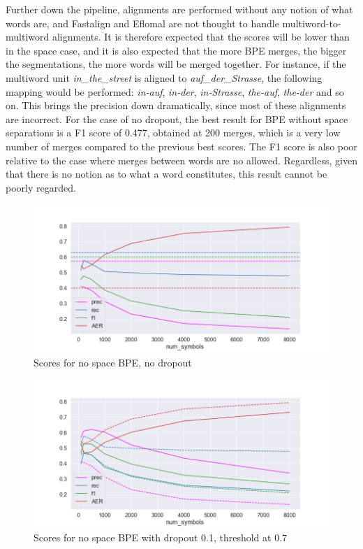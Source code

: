 Further down the pipeline, alignments are performed without any notion of what words are, and Fastalign and Eflomal are not thought to handle multiword-to-multiword alignments. It is therefore expected that the scores will be lower than in the space case, and it is also expected that the more BPE merges, the bigger the segmentations, the more words will be merged together. For instance, if the multiword unit \emph{in\_the\_street} is aligned to \emph{auf\_der\_Strasse}, the following mapping would be performed: \emph{in-auf}, \emph{in-der}, \emph{in-Strasse}, \emph{the-auf}, \emph{the-der} and so on. This brings the precision down dramatically, since most of these alignments are incorrect. For the case of no dropout, the best result for BPE without space separations is a F1 score of 0.477, obtained at 200 merges, which is a very low number of merges compared to the previous best scores. The F1 score is also poor relative to the case where merges between words are no allowed. Regardless, given that there is no notion as to what a word constitutes, this result cannot be poorly regarded.

\begin{figure}[!ht]
    \centering
    \includegraphics[width=11.5cm]{../reports/scores_normal_bpe/eng_deu_ns_fastalign.png}
    \caption{Scores for no space BPE, no dropout}
\end{figure}

\begin{figure}[!ht]
    \centering
    \includegraphics[width=11.5cm]{../reports/scores_dropout_bpe/no space/0.1/scores_ns_0.7_thres.png}
    \caption{Scores for no space BPE with dropout 0.1, threshold at 0.7}
\end{figure}


